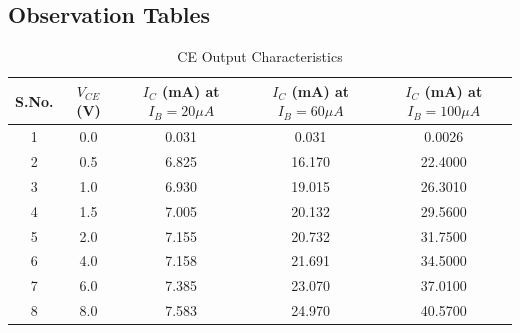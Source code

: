 \documentclass[12pt,a4paper]{article}
\begin{document}
\subsection{Observation Tables}
\begin{table}[H]
    \centering
    \caption{CE Output Characteristics}
    \begin{tabular}{|c|c|c|c|c|}
        \hline
        \textbf{S.No.} & \textbf{$V_{CE}$ (V)} & \textbf{$I_C$ (mA) at $I_B=20\mu A$} & \textbf{$I_C$ (mA) at $I_B=60\mu A$} & \textbf{$I_C$ (mA) at $I_B=100\mu A$} \\ \hline
        1 & 0.0 & 0.031 & 0.031 & 0.0026 \\ \hline
        2 & 0.5 & 6.825 & 16.170 & 22.4000 \\ \hline
        3 & 1.0 & 6.930 & 19.015 & 26.3010 \\ \hline
        4 & 1.5 & 7.005 & 20.132 & 29.5600 \\ \hline
        5 & 2.0 & 7.155 & 20.732 & 31.7500 \\ \hline
        6 & 4.0 & 7.158 & 21.691 & 34.5000 \\ \hline
        7 & 6.0 & 7.385 & 23.070 & 37.0100 \\ \hline
        8 & 8.0 & 7.583 & 24.970 & 40.5700 \\ \hline
    \end{tabular}
\end{table}
\end{document}

